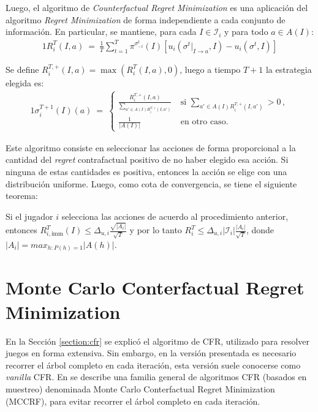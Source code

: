 Luego, el algoritmo de \textit{Counterfactual Regret Minimization} es una aplicación del algoritmo \textit{Regret Minimization} de forma independiente a cada conjunto de información. En particular, se mantiene, para cada $I \in \mathcal{I}_i$ y para todo $a \in A(I)$:
\begin{alignat}{1}
R_i^T(I, a)\ =\ \frac{1}{T} \sum_{t = 1}^T \pi^{\sigma^t_{-i}}(I)[u_i(\sigma^t|_{I \rightarrow a}, I) - u_i(\sigma^t, I)]
\end{alignat}

Se define $R_i^{T, +}(I, a) = \max(R_i^T(I, a), 0)$, luego a tiempo $T+1$ la estrategia elegida es:
\begin{alignat}{1}
\label{eq:cfr-regret-matching}
\sigma_i^{T+1}(I)(a)\ =\
\begin{cases}
\frac{R_i^{T, +}(I, a)}{\sum_{a' \in A(I) R_i^{T, +}(I, a')}}\ & \text{si } \sum_{a' \in A(I) R_i^{T, +}(I, a')} > 0 \,, \\
\frac{1}{|A(I)|}\ & \text{en otro caso.} 
\end{cases}
\end{alignat}

Este algoritmo consiste en seleccionar las acciones de forma proporcional a la cantidad del \textit{regret} contrafactual positivo de no haber elegido esa acción. Si ninguna de estas cantidades es positiva, entonces la acción se elige con una distribución uniforme. Luego, como cota de convergencia, se tiene el siguiente teorema:
\begin{theorem}
Si el jugador $i$ selecciona las acciones de acuerdo al procedimiento anterior, entonces $R^T_{i, \text{imm}}(I) \leq \Delta_{u, i} \frac{\sqrt{|A_i|}}{\sqrt{T}}$ y por lo tanto $R_i^T \leq \Delta_{u, i} |\mathcal{I}_i| \frac{|A_i|}{\sqrt T}$, donde $|A_i| = max_{h : P(h) = 1}{|A(h)|}$.
\end{theorem}


\section{Monte Carlo Conterfactual Regret Minimization}

En la Sección \ref{section:cfr} se explicó el algoritmo de CFR, utilizado para resolver juegos en forma extensiva. Sin embargo, en la versión presentada es necesario recorrer el árbol completo en cada iteración, esta versión suele conocerse como \textit{vanilla} CFR. En \cite{bib:montecarlo-cfr} se describe una familia general de algoritmos CFR (basados en muestreo) denominada Monte Carlo Conterfactual Regret Minimization (MCCRF), para evitar recorrer el árbol completo en cada iteración.

